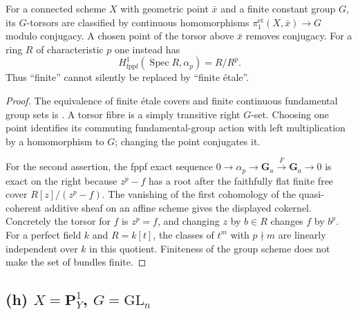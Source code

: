 \begin{proposition}
\label{geo-Kg}
For a connected scheme $X$ with geometric point $\bar x$ and a finite
constant group $G$, its $G$-torsors are classified by continuous
homomorphisms $\pi_1^{\mathrm{\acute et}}(X,\bar x)\to G$ modulo
conjugacy. A chosen point of the torsor above $\bar x$ removes conjugacy.
For a ring $R$ of characteristic $p$ one instead has
\[
 H^1_{\mathrm{fppf}}(\operatorname{Spec}R,\alpha_p)=R/R^p.
\]
Thus ``finite'' cannot silently be replaced by ``finite \'etale''.
\end{proposition}
\begin{proof}
The equivalence of finite \'etale covers and finite continuous fundamental
group sets is \cite[Theorem 58.6.2, tag 0BND]{geoStacksPiOne}.
A torsor fibre is a simply transitive right $G$-set. Choosing one point
identifies its commuting fundamental-group action with left multiplication
by a homomorphism to $G$; changing the point conjugates it.

For the second assertion, the fppf exact sequence
$0\to\alpha_p\to\mathbf G_a\xrightarrow{F}\mathbf G_a\to0$
is exact on the right because $z^p-f$ has a root after the faithfully flat
finite free cover $R[z]/(z^p-f)$. The vanishing of the first cohomology of
the quasi-coherent additive sheaf on an affine scheme gives the displayed
cokernel. Concretely the torsor for $f$ is $z^p=f$, and changing $z$ by
$b\in R$ changes $f$ by $b^p$. For a perfect field $k$ and $R=k[t]$, the
classes of $t^m$ with $p\nmid m$ are linearly independent over $k$ in this
quotient. Finiteness of the group scheme does not make the set of bundles
finite.
\end{proof}

\subsection{(h) $X=\mathbf P^1_Y$, $G=\mathrm{GL}_n$}

